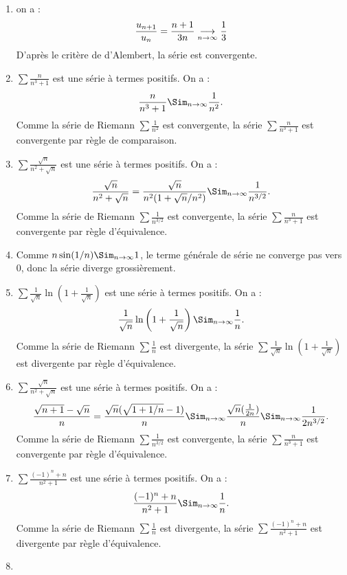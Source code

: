 \documentclass{book}
\begin{document}
\begin{Exercice}[Nature]
\begin{Correction}
    \begin{enumerate}
    \item on a : $$\frac{u_{n+1}}{u_n} =\frac{n+1}{3n}\tend[n\to\infty]\frac{1}{3}$$ D'après le critère de d'Alembert, la série est convergente.
        \item $\sum \frac{n}{n^3+1}$ est une série à termes positifs. On a :
$$\frac{n}{n^3+1}\Sim_{n\to\infty}\frac{1}{n^2}.$$
Comme la série de Riemann $\sum \frac{1}{n^2}$ est convergente, la série $\sum \frac{n}{n^3+1}$ est convergente par règle de comparaison.
        \item $\sum \frac{\sqrt n}{n^2+\sqrt n}$ est une série à termes positifs. On a :
$$\frac{\sqrt n}{n^2+\sqrt n} =\frac{\sqrt n}{n^2(1 +\sqrt n /n^2)}  \Sim_{n\to\infty}\frac{1}{n^{3/2}}.$$
Comme la série de Riemann $\sum \frac{1}{n^{3/2}}$ est convergente, la série $\sum \frac{n}{n^3+1}$ est convergente par règle d'équivalence.
\item Comme  $ n\sin(1/n)\Sim_{n\to\infty} 1$, le terme générale de série ne converge pas vers 0, donc la série diverge grossièrement.
\item $\sum \frac{1}{\sqrt{n}}\ln\left(1+\frac{1}{\sqrt{n}}\right)$ est une série à termes positifs. On a :
$$\frac{1}{\sqrt{n}}\ln\left(1+\frac{1}{\sqrt{n}}\right)   \Sim_{n\to\infty}\frac{1}{n}.$$ 
Comme la série de Riemann $\sum \frac{1}{n}$ est divergente, la série $\sum \frac{1}{\sqrt{n}}\ln\left(1+\frac{1}{\sqrt{n}}\right)$  est divergente par règle d'équivalence.
\item $\sum \frac{\sqrt n}{n^2+\sqrt n}$ est une série à termes positifs. On a :
$$\frac{\sqrt {n+1}-\sqrt{n}}{n} =\frac{\sqrt{n}(\sqrt {1+1/n}-1)}{n}  \Sim_{n\to\infty}\frac{\sqrt{n}(\frac{1}{2n})}{n}\Sim_{n\to\infty}\frac{1}{2n^{3/2}}   .$$
Comme la série de Riemann $\sum \frac{1}{n^{3/2}}$ est convergente, la série $\sum \frac{n}{n^3+1}$ est convergente par règle d'équivalence.
 \item $\sum \frac{(-1)^n +n}{n^2+1}$ est une série à termes positifs. On a :
$$\frac{(-1)^n +n}{n^2+1}   \Sim_{n\to\infty}\frac{1}{n}.$$ 
Comme la série de Riemann $\sum \frac{1}{n}$ est divergente, la série $\sum \frac{(-1)^n +n}{n^2+1}$  est divergente par règle d'équivalence.
 \item  
 
 
 

\end{enumerate}
\end{Correction}
\end{Exercice}
\end{document}
